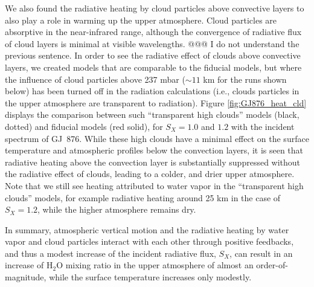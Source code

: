 \documentclass[11pt,numberedappendix,twocolappendix,]{emulateapj}
\def\water{H$_2$O }
\newcommand{\dsa}[1]{{\color{blue}#1}}
\begin{document}
We also found the radiative heating by cloud particles above convective layers \dsa{to also play} a role in warming up the \dsa{upper atmosphere}. 
\dsa{Cloud particles} are absorptive in the near-infrared range, although the convergence of radiative flux of cloud layers is minimal at visible wavelengths. \dsa{@@@ I do not understand the previous sentence.}  
In order to see the radiative effect of clouds above convective layers, we \dsa{created models} that are comparable to the fiducial models, \dsa{but where the} influence of cloud particles above 237 mbar ($\sim 11$ km for the runs shown below) \dsa{has been turned off} in the radiation calculations (i.e., clouds particles in the upper atmosphere are transparent to radiation). 
Figure \ref{fig:GJ876_heat_cld} displays the comparison between such ``transparent high clouds'' models (black, dotted) \dsa{and fiducial} models (red solid), for $S_X=1.0$ and $1.2$ with the incident spectrum of GJ~876. 
While these high clouds have \dsa{a} minimal effect on the surface temperature and atmospheric profiles below the convection layers, it is seen that radiative heating above the convection layer is substantially suppressed without the radiative effect of clouds, leading to \dsa{a} colder, and drier upper atmosphere. 
Note that we still see heating attributed to water vapor in the ``transparent high clouds'' models, for example radiative heating around 25 km in the case of $S_X=1.2$, while the higher atmosphere remains dry. 

In summary, atmospheric vertical motion and the radiative heating by water vapor and cloud particles interact with each other \dsa{through} positive feedbacks, and thus a modest increase of the incident radiative flux, $S_X$, can result in \dsa{an increase of \water mixing ratio in the upper atmosphere of almost an order-of-magnitude}, while the surface temperature increases only modestly. 

\end{document}
